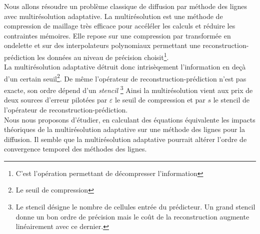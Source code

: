 Nous allons résoudre un problème classique de diffusion par méthode des lignes avec multirésolution adaptative.
La multirésolution est une méthode de compression de maillage très efficace pour accéléler les calculs et réduire les contraintes mémoires.
Elle repose sur une compression par transformée en ondelette et sur des interpolateurs polynomiaux permettant une reconstruction-prédiction
les données au niveau de précision choisit\footnote{C'est l'opération permettant de décompresser l'information}.\\
La multirésolution adaptative détruit donc intrisèqement l'information en deçà d'un certain seuil\footnote{Le seuil de compression}. De même 
l'opérateur de reconstruction-prédiction n'est pas exacte, son ordre dépend d'un \textit{stencil}
\footnote{Le stencil désigne le nombre de cellules entrée du prédicteur. Un grand stencil donne un bon ordre de précision mais le coût de la reconstruction
augmente linéairement avec ce dernier.} Ainsi la multirésolution vient aux prix de deux sources d'erreur pilotées par $\varepsilon$ le seuil de compression
et par $s$ le stencil de l'opérateur de reconstruction-prédiction.\\
Nous nous proposons d'étudier, en calculant des équations équivalente les impacts théoriques de la multirésolution adaptative 
sur une méthode des lignes pour la diffusion.
Il semble que la multirésolution adaptative pourrait altérer l'ordre de convergence temporel des méthodes des lignes.